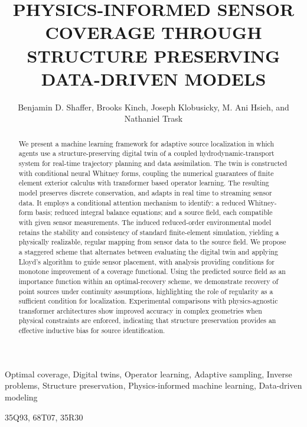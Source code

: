 \documentclass[onefignum,onetabnum]{siamart171218} %
\title{\bf PHYSICS-INFORMED SENSOR COVERAGE THROUGH STRUCTURE PRESERVING DATA-DRIVEN MODELS}
\author{Benjamin D. Shaffer, Brooks Kinch, Joseph Klobusicky, M. Ani Hsieh, and Nathaniel Trask}
\begin{document}
\maketitle
\thispagestyle{plain}
\pagestyle{plain}


\begin{abstract}
We present a machine learning framework for adaptive source localization in which agents use a structure-preserving digital twin of a coupled hydrodynamic-transport system for real-time trajectory planning and data assimilation. The twin is constructed with conditional neural Whitney forms, coupling the numerical guarantees of finite element exterior calculus with transformer based operator learning. The resulting model preserves discrete conservation, and adapts in real time to streaming sensor data. It employs a conditional attention mechanism to identify: a reduced Whitney-form basis; reduced integral balance equations; and a source field, each compatible with given sensor measurements. The induced reduced-order environmental model retains the stability and consistency of standard finite-element simulation, yielding a physically realizable, regular mapping from sensor data to the source field. We propose a staggered scheme that alternates between evaluating the digital twin and applying Lloyd’s algorithm to guide sensor placement, with analysis providing conditions for monotone improvement of a coverage functional. Using the predicted source field as an importance function within an optimal-recovery scheme, we demonstrate recovery of point sources under continuity assumptions, highlighting the role of regularity as a sufficient condition for localization. Experimental comparisons with physics-agnostic transformer architectures show improved accuracy in complex geometries when physical constraints are enforced, indicating that structure preservation provides an effective inductive bias for source identification.
\end{abstract}

\begin{keywords}
  Optimal coverage, Digital twins, Operator learning, Adaptive sampling, Inverse problems, Structure preservation, Physics-informed machine learning, Data-driven modeling
\end{keywords} 

\begin{AMS}
    35Q93, 68T07, 35R30
\end{AMS}
\end{document}
